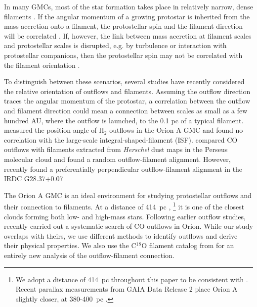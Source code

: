 \documentclass[twocolumn]{aastex63}
\begin{document}
In many GMCs, most of the star formation takes place in relatively narrow, dense filaments \citep{Arzoumanian11,Suri19}. If the angular momentum of a growing protostar is inherited from the mass accretion onto a filament, the protostellar spin and the filament direction will be correlated \citep{Bodenheimer95,Andre14,Li19}. If, however, the link between mass accretion at filament scales and protostellar scales is disrupted, e.g. by turbulence or interaction with protostellar companions, then the protostellar spin may not be correlated with the filament orientation \citep{Offner16,Lee17}.


To distinguish between these scenarios, several studies have recently considered the relative orientation of outflows and filaments. Assuming the outflow direction traces the angular momentum of the protostar, a correlation between the outflow and filament direction could mean a connection between scales as small as a few hundred AU, where the outflow is launched, to the 0.1 pc of a typical filament. \citet{Davis09} measured the position angle of H$_2$ outflows in the Orion A GMC and found no correlation with the large-scale integral-shaped-filament (ISF). \citet{Stephens17} compared CO outflows with filaments extracted from \emph{Herschel} dust maps in the Perseus molecular cloud and found a random outflow-filament alignment. However, \citet{Kong19} recently found a preferentially perpendicular outflow-filament alignment in the IRDC G28.37+0.07

The Orion A GMC is an ideal environment for studying protostellar outflows and their connection to filaments. At a distance of 414~pc \citep{Menten07}, \footnote{We adopt a distance of 414~pc throughout this paper to be consistent with \citet{Tanabe:submitted}. Recent parallax measurements from GAIA Data Release 2 place Orion A slightly closer, at 380-400~pc \citep{Kounkel18,Grossschedl18,Kuhn19}.} it is one of the closest clouds forming both low- and high-mass stars. Following earlier outflow studies, \citet{Tanabe:submitted} recently carried out a systematic search of CO outflows in Orion. While our study overlaps with theirs, we use different methods to identify outflows and derive their physical properties. We also use the C$^{18}$O filament catalog from \citet{Suri19} for an entirely new analysis of the outflow-filament connection.
\end{document}

